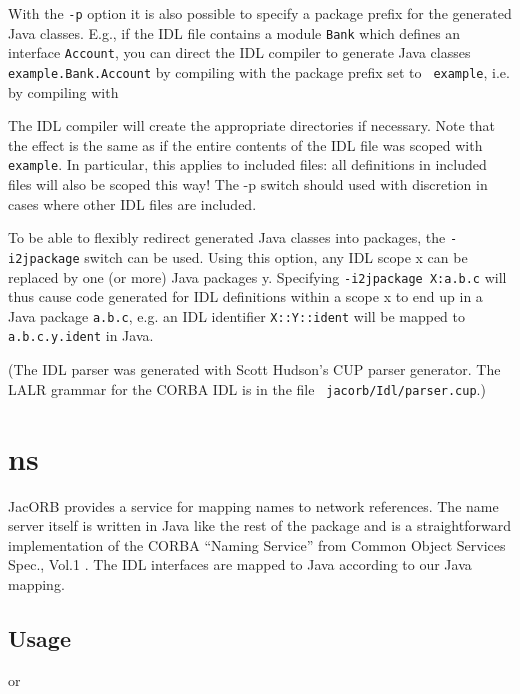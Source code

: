 \documentclass[12pt]{scrbook}
\begin{document}
With the  {\tt -p}  option it  is also possible  to specify  a package
prefix for the generated Java  classes. E.g., if the IDL file contains
a module {\tt Bank} which  defines an interface {\tt Account}, you can
direct   the   IDL   compiler    to   generate   Java   classes   {\tt
example.Bank.Account} by compiling with the package prefix set to {\tt
example}, i.e. by compiling with


The IDL compiler will create the appropriate directories if necessary.
Note that the effect is the same as if the entire contents of the IDL
file was scoped with {\tt example}. In particular, this applies to
included files: all definitions in included files will also be scoped
this way! The -p switch should used with discretion in cases where
other IDL files are included.

To be able to flexibly redirect generated Java classes into packages,
the {\tt -i2jpackage} switch can be used. Using this option, any IDL
scope x can be replaced by one (or more) Java packages y. Specifying
{\tt -i2jpackage X:a.b.c} will thus cause code generated for IDL
definitions within a scope x to end up in a Java package {\tt a.b.c},
e.g. an IDL identifier {\tt X::Y::ident} will be mapped to {\tt
  a.b.c.y.ident} in Java.

(The  IDL  parser  was   generated  with  Scott  Hudson's  CUP  parser
generator.  The  LALR grammar for  the CORBA IDL  is in the  file {\tt
jacorb/Idl/parser.cup}.)

\section{ns}

JacORB provides a service for mapping names to network references. The
name server itself is written in Java like the rest of the package and
is a  straightforward implementation  of the CORBA  ``Naming Service''
from  Common  Object Services  Spec.,  Vol.1  \cite{OMG1997}. The  IDL
interfaces are mapped to Java according to our Java mapping.

\subsection*{Usage}


or

\end{document}
